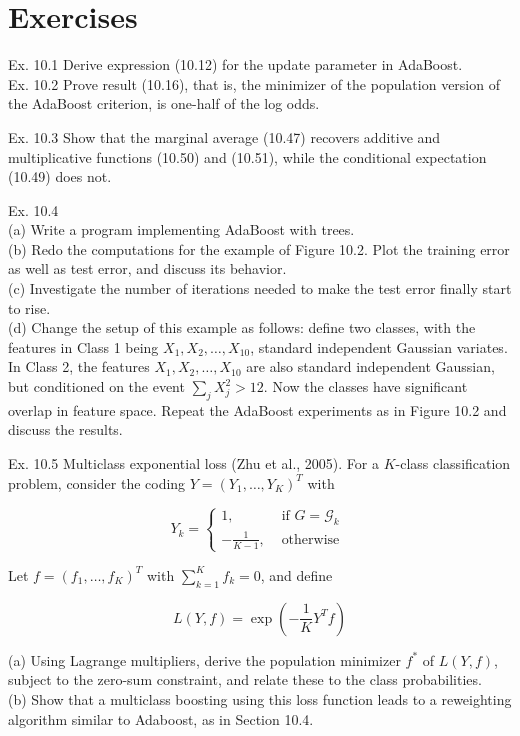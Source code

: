 \documentclass[10pt]{article}
\begin{document}
\section*{Exercises}
Ex. 10.1 Derive expression (10.12) for the update parameter in AdaBoost.\\
Ex. 10.2 Prove result (10.16), that is, the minimizer of the population version of the AdaBoost criterion, is one-half of the log odds.

Ex. 10.3 Show that the marginal average (10.47) recovers additive and multiplicative functions (10.50) and (10.51), while the conditional expectation (10.49) does not.

Ex. 10.4\\
(a) Write a program implementing AdaBoost with trees.\\
(b) Redo the computations for the example of Figure 10.2. Plot the training error as well as test error, and discuss its behavior.\\
(c) Investigate the number of iterations needed to make the test error finally start to rise.\\
(d) Change the setup of this example as follows: define two classes, with the features in Class 1 being $X_{1}, X_{2}, \ldots, X_{10}$, standard independent Gaussian variates. In Class 2, the features $X_{1}, X_{2}, \ldots, X_{10}$ are also standard independent Gaussian, but conditioned on the event $\sum_{j} X_{j}^{2}>12$. Now the classes have significant overlap in feature space. Repeat the AdaBoost experiments as in Figure 10.2 and discuss the results.

Ex. 10.5 Multiclass exponential loss (Zhu et al., 2005). For a $K$-class classification problem, consider the coding $Y=\left(Y_{1}, \ldots, Y_{K}\right)^{T}$ with

\[
Y_{k}= \begin{cases}1, & \text { if } G=\mathcal{G}_{k}  \tag{10.55}\\ -\frac{1}{K-1}, & \text { otherwise }\end{cases}
\]

Let $f=\left(f_{1}, \ldots, f_{K}\right)^{T}$ with $\sum_{k=1}^{K} f_{k}=0$, and define


\begin{equation*}
L(Y, f)=\exp \left(-\frac{1}{K} Y^{T} f\right) \tag{10.56}
\end{equation*}


(a) Using Lagrange multipliers, derive the population minimizer $f^{*}$ of $L(Y, f)$, subject to the zero-sum constraint, and relate these to the class probabilities.\\
(b) Show that a multiclass boosting using this loss function leads to a reweighting algorithm similar to Adaboost, as in Section 10.4.
\end{document}
